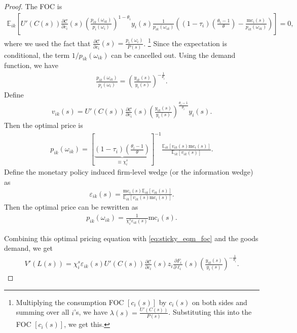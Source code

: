 \documentclass[12pt]{article}
\numberwithin{equation}{section}
\begin{document}
\begin{proof}
    The FOC is
    \begin{align*}
        \mathbb{E}_{ik} \left[U'(C(s)) \frac{\partial \mathcal{C}}{\partial c_i}(s) \left(\frac{p_{ik}(\omega_{ik})}{p_i(\omega_i)}\right)^{1-\theta_i} y_i(s) \frac{1}{p_{ik}(\omega_{ik})} \left((1-\tau_i)\left(\frac{\theta_i-1}{\theta}\right) - \frac{\text{mc}_i(s)}{p_{ik}(\omega_{ik})}\right) \right] =0,
    \end{align*}
    where we used the fact that $\frac{\partial \mathcal{C}}{\partial c_i}(s) = \frac{p_{i}(\omega_i)}{P(s)}$. \footnote{Multiplying the consumption FOC $[c_i(s)]$ by $c_i(s)$ on both sides and summing over all $i$'s, we have \(\lambda(s) = \frac{U'(C(s))}{P(s)}\). Substituting this into the FOC $[c_i(s)]$, we get this.}
    Since the expectation is conditional, the term $1/p_{ik}(\omega_{ik})$ can be cancelled out. Using the demand function, we have 
    \begin{align*}
        \frac{p_{ik}(\omega_{ik})}{p_i(\omega_i)} = \left(\frac{y_{ik}(s)}{y_i(s)}\right)^{-\frac{1}{\theta_i}}.
    \end{align*}
    Define 
    \begin{align*}
        v_{ik}(s) = U'(C(s)) \frac{\partial \mathcal{C}}{\partial c_i}(s) \left(\frac{y_{ik}(s)}{y_i(s)}\right)^{\frac{\theta_i-1}{\theta_i}} y_i(s).
    \end{align*}
    Then the optimal price is
    \begin{align*}
        p_{ik}(\omega_{ik}) = \left[\underbrace{(1-\tau_i)\left(\frac{\theta_i-1}{\theta}\right)}_{\equiv \chi_i^s}\right]^{-1}\frac{\mathbb{E}_{ik}[v_{ik}(s) \text{mc}_i(s)]}{\mathbb{E}_{ik}[v_{ik}(s)]}.
    \end{align*}
    Define the monetary policy induced firm-level wedge (or the information wedge) as
    \begin{align*}
        \varepsilon_{ik}(s) = \frac{\text{mc}_i(s)\mathbb{E}_{ik}[v_{ik}(s)]}{\mathbb{E}_{ik}[v_{ik}(s) \text{mc}_i(s)]}.
    \end{align*}
    Then the optimal price can be rewritten as
    \begin{align}\label{eq:sticky_eqm_opt_price}
        p_{ik}(\omega_{ik}) = \frac{1}{\chi_i^s \varepsilon_{ik}(s)} \text{mc}_i(s).
    \end{align}

    Combining this optimal pricing equation with \eqref{eq:sticky_eqm_foc} and the goods demand, we get
    \begin{align*}
        V'(L(s)) = \chi_i^s \varepsilon_{ik}(s) U'(C(s)) \frac{\partial \mathcal{C}}{\partial c_i}(s) z_i \frac{\partial F_i}{\partial \ell_i}(s) \left(\frac{y_{ik}(s)}{y_i(s)}\right)^{-\frac{1}{\theta_i}}.
    \end{align*}


\end{proof}
\end{document}
